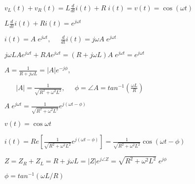 \documentclass{article}
\def\lthtmlcheckvsize{\ifdim\ht\sizebox<\vsize 
  \ifdim\wd\sizebox<\hsize\expandafter\hfill\fi \expandafter\vfill
  \else\expandafter\vss\fi}%
\begin{document}
{\newpage\clearpage
{}%
$\displaystyle v_L(t)+v_R(t)=L\frac{d}{dt}i(t)+R\;i(t)=v(t)=\cos(\omega t)$%
\lthtmlindisplaymathZ
\lthtmlcheckvsize\clearpage}

{\newpage\clearpage
{}%
$\displaystyle L\frac{d}{dt}i(t)+Ri(t)=e^{j\omega t}$%
\lthtmlindisplaymathZ
\lthtmlcheckvsize\clearpage}

{\newpage\clearpage
{}%
$\displaystyle i(t)=A\;e^{j\omega t},\;\;\;\;\;\frac{d}{dt}i(t)=j\omega A\;e^{j\omega t}$%
\lthtmlindisplaymathZ
\lthtmlcheckvsize\clearpage}

{\newpage\clearpage
{}%
$\displaystyle j\omega L A e^{j\omega t}+RA e^{j\omega t}
=(R+j\omega L)A\; e^{j\omega t}=e^{j\omega t}$%
\lthtmlindisplaymathZ
\lthtmlcheckvsize\clearpage}

{\newpage\clearpage
{}%
$\displaystyle A=\frac{1}{R+j\omega L}=|A|e^{-j\phi},\;\;\;\;$%
\lthtmlindisplaymathZ
\lthtmlcheckvsize\clearpage}

{\newpage\clearpage
{}%
$\displaystyle \;\;\;\;\;\;|A|=\frac{1}{\sqrt{R^2+\omega^2 L^2}},\;\;\;\;\;
\phi=\angle A=tan^{-1}\left(\frac{\omega L}{R}\right)$%
\lthtmlindisplaymathZ
\lthtmlcheckvsize\clearpage}

{\newpage\clearpage
{}%
$\displaystyle A\;e^{j\omega t}=\frac{1}{\sqrt{R^2+\omega^2 L^2}} e^{j(\omega t-\phi)}$%
\lthtmlindisplaymathZ
\lthtmlcheckvsize\clearpage}

{\newpage\clearpage
{}%
$ v(t)=\cos \omega t$%
\lthtmlindisplaymathZ
\lthtmlcheckvsize\clearpage}

{\newpage\clearpage
{}%
$\displaystyle i(t)=Re\left[\frac{1}{\sqrt{R^2+\omega^2 L^2}} e^{j(\omega t-\phi)}\right]
=\frac{1}{\sqrt{R^2+\omega^2 L^2}} \cos(\omega t-\phi)$%
\lthtmlindisplaymathZ
\lthtmlcheckvsize\clearpage}

{\newpage\clearpage
{}%
$\displaystyle Z=Z_R+Z_L=R+j\omega L=|Z| e^{j\angle Z}=\sqrt{R^2+\omega^2L^2}\;e^{j \phi}$%
\lthtmlindisplaymathZ
\lthtmlcheckvsize\clearpage}

{\newpage\clearpage
{}%
$ \phi=tan^{-1}(\omega L/R)$%
\lthtmlindisplaymathZ
\lthtmlcheckvsize\clearpage}
\end{document}
